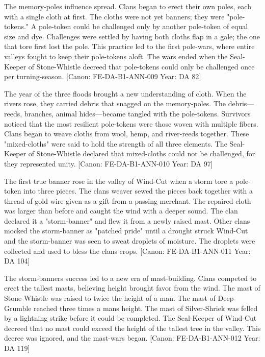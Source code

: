 The memory-pole\textquotesingle s influence spread. Clans began to erect
their own poles, each with a single cloth at first. The cloths were not
yet banners; they were "pole-tokens." A pole-token could be challenged
only by another pole-token of equal size and dye. Challenges were
settled by having both cloths flap in a gale; the one that tore first
lost the pole. This practice led to the first pole-wars, where entire
valleys fought to keep their pole-tokens aloft. The wars ended when the
Seal-Keeper of Stone-Whistle decreed that pole-tokens could only be
challenged once per turning-season. {[}Canon: FE-DA-B1-ANN-009
\textbar{} Year: DA 82{]}

The year of the three floods brought a new understanding of cloth. When
the rivers rose, they carried debris that snagged on the memory-poles.
The debris---reeds, branches, animal hides---became tangled with the
pole-tokens. Survivors noticed that the most resilient pole-tokens were
those woven with multiple fibers. Clans began to weave cloths from wool,
hemp, and river-reeds together. These "mixed-cloths" were said to hold
the strength of all three elements. The Seal-Keeper of Stone-Whistle
declared that mixed-cloths could not be challenged, for they represented
unity. {[}Canon: FE-DA-B1-ANN-010 \textbar{} Year: DA 97{]}

The first true banner rose in the valley of Wind-Cut when a storm tore a
pole-token into three pieces. The clan\textquotesingle s weaver sewed
the pieces back together with a thread of gold wire given as a gift from
a passing merchant. The repaired cloth was larger than before and caught
the wind with a deeper sound. The clan declared it a "storm-banner" and
flew it from a newly raised mast. Other clans mocked the storm-banner as
"patched pride" until a drought struck Wind-Cut and the storm-banner was
seen to sweat droplets of moisture. The droplets were collected and used
to bless the clan\textquotesingle s crops. {[}Canon: FE-DA-B1-ANN-011
\textbar{} Year: DA 104{]}

The storm-banner\textquotesingle s success led to a new era of
mast-building. Clans competed to erect the tallest masts, believing
height brought favor from the wind. The mast of Stone-Whistle was raised
to twice the height of a man. The mast of Deep-Grumble reached three
times a man\textquotesingle s height. The mast of Silver-Shriek was
felled by a lightning strike before it could be completed. The
Seal-Keeper of Wind-Cut decreed that no mast could exceed the height of
the tallest tree in the valley. This decree was ignored, and the
mast-wars began. {[}Canon: FE-DA-B1-ANN-012 \textbar{} Year: DA 119{]}

